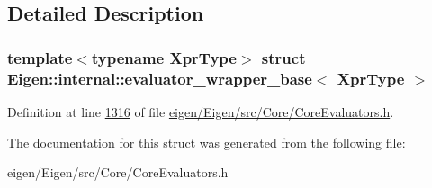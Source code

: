 \subsection{Detailed Description}
\subsubsection*{template$<$typename Xpr\+Type$>$\newline
struct Eigen\+::internal\+::evaluator\+\_\+wrapper\+\_\+base$<$ Xpr\+Type $>$}



Definition at line \hyperlink{eigen_2_eigen_2src_2_core_2_core_evaluators_8h_source_l01316}{1316} of file \hyperlink{eigen_2_eigen_2src_2_core_2_core_evaluators_8h_source}{eigen/\+Eigen/src/\+Core/\+Core\+Evaluators.\+h}.



The documentation for this struct was generated from the following file\+:\begin{DoxyCompactItemize}
\item 
eigen/\+Eigen/src/\+Core/\+Core\+Evaluators.\+h\end{DoxyCompactItemize}
